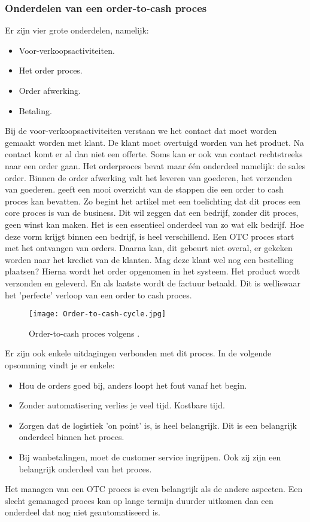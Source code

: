 \subsubsection{Onderdelen van een order-to-cash proces}
Er zijn vier grote onderdelen, namelijk:
\begin{itemize}
	\item Voor-verkoopsactiviteiten.
	\item Het order proces.
	\item Order afwerking.
	\item Betaling.
\end{itemize}
Bij de voor-verkoopsactiviteiten verstaan we het contact dat moet worden gemaakt worden met klant. De klant moet overtuigd worden van het product. Na contact komt er al dan niet een offerte. Soms kan er ook van contact rechtstreeks naar een order gaan. 
Het orderproces bevat maar één onderdeel namelijk: de sales order. 
Binnen de order afwerking valt het leveren van goederen, het verzenden van goederen.
\textcite{Kumaran2015} geeft een mooi overzicht van de stappen die een order to cash proces kan bevatten. Zo begint het artikel met een toelichting dat dit proces een core proces is van de business. Dit wil zeggen dat een bedrijf, zonder dit proces, geen winst kan maken. Het is een essentieel onderdeel van zo wat elk bedrijf. Hoe deze vorm krijgt binnen een bedrijf, is heel verschillend. Een OTC proces start met het ontvangen van orders. Daarna kan, dit gebeurt niet overal, er gekeken worden naar het krediet van de klanten. Mag deze klant wel nog een bestelling plaatsen? Hierna wordt het order opgenomen in het systeem. Het product wordt verzonden en geleverd. En als laatste wordt de factuur betaald. Dit is welliswaar het 'perfecte' verloop van een order to cash proces. 
\begin{figure}[h]
	\texttt{[image: Order-to-cash-cycle.jpg]}
	\caption{Order-to-cash proces volgens \textcite{Kumaran2015}.}
	\centering
\end{figure}
Er zijn ook enkele uitdagingen verbonden met dit proces. In de volgende opsomming vindt je er enkele:
\begin{itemize}
	\item Hou de orders goed bij, anders loopt het fout vanaf het begin. 
	\item Zonder automatisering verlies je veel tijd. Kostbare tijd.
	\item Zorgen dat de logistiek 'on point' is, is heel belangrijk. Dit is een belangrijk onderdeel binnen het proces.
	\item Bij wanbetalingen, moet de customer service ingrijpen. Ook zij zijn een belangrijk onderdeel van het proces.
\end{itemize}
Het managen van een OTC proces is even belangrijk als de andere aspecten. Een slecht gemanaged proces kan op lange termijn duurder uitkomen dan een onderdeel dat nog niet geautomatiseerd is. 

